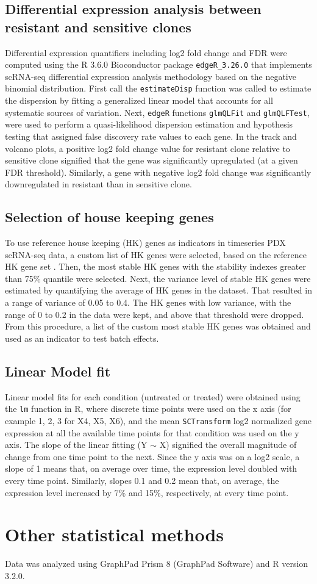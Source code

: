 \subsection{Differential expression analysis between resistant and sensitive clones}
Differential expression quantifiers including log2 fold change and FDR  were computed using the R 3.6.0 Bioconductor package \texttt{edgeR\_3.26.0} that implements scRNA-seq differential expression analysis methodology based on the negative binomial distribution. First call the \texttt{estimateDisp} function was called to estimate the dispersion by fitting a generalized linear model that accounts for all systematic sources of variation. Next,  \texttt{edgeR} functions \texttt{glmQLFit} and \texttt{glmQLFTest}, were used to perform a quasi-likelihood dispersion estimation and hypothesis testing that assigned false discovery rate values to each gene. In the track and volcano plots, a positive log2 fold change value for resistant clone relative to sensitive clone signified that the gene was significantly upregulated (at a given FDR threshold).  Similarly, a gene with negative log2 fold change was significantly downregulated in resistant than in sensitive clone.

\subsection{Selection of house keeping genes}
To use reference house keeping (HK) genes as indicators in timeseries PDX scRNA-seq data,  a custom list of HK genes were selected, based on the reference HK gene set \cite{lin2019evaluating}. Then, the most stable HK genes with the stability indexes  greater than 75\% quantile were selected. Next, the variance level of stable HK genes were estimated by quantifying the average of HK genes in the dataset. That resulted in a range of variance of 0.05 to 0.4. The HK genes with low variance, with the range of 0 to 0.2 in the data were kept, and above that threshold were dropped. From this procedure, a list of the custom most stable HK genes was obtained and used as an indicator to test batch effects. 


\subsection{Linear Model fit}
Linear model fits for each condition (untreated or treated) were obtained using the \texttt{lm} function in R, where discrete time points were used on the x axis (for example 1, 2, 3 for X4, X5, X6), and the mean \texttt{SCTransform} log2 normalized gene expression at all the available time points for that condition was used on the y axis.
The slope of the linear fitting (Y $\sim$ X) signified the overall magnitude of change from one time point to the next. Since the y axis was on a log2 scale, a slope of 1 means that, on average over time, the expression level doubled with every time point. Similarly, slopes 0.1 and 0.2 mean that, on average, the expression level increased by 7\% and 15\%, respectively, at every time point.

\section{Other statistical methods}
Data was analyzed using GraphPad Prism 8 (GraphPad Software) and R version 3.2.0.